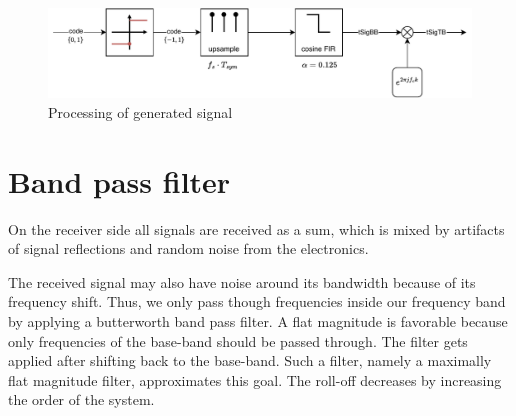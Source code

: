 %
%
\begin{figure}[h]
	\includegraphics[width=\linewidth]{images/sensig}
	
	\caption{Processing of generated signal}
	\label{fig:sensig}
\end{figure}


\section{Band pass filter}
On the receiver side all signals are received as a sum, which is mixed by artifacts of signal reflections and random noise from the electronics.

The received signal may also have noise around its bandwidth because of its frequency shift. Thus, we only pass though frequencies inside our frequency band by applying a butterworth band pass filter.
A flat magnitude is favorable because only frequencies of the base-band should be passed through. 
The filter gets applied after shifting back to the base-band. Such a filter, namely a maximally flat magnitude filter, approximates this goal. The roll-off decreases by increasing the order of the system.


